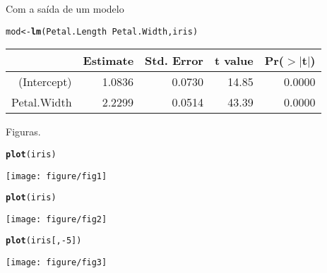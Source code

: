 \documentclass{article}\usepackage[]{graphicx}\usepackage[]{color}
\makeatletter
\def\maxwidth{ %
  \ifdim\Gin@nat@width>\linewidth
    \linewidth
  \else
    \Gin@nat@width
  \fi
}
\newcommand{\hlnum}[1]{\textcolor[rgb]{0.686,0.059,0.569}{#1}}%
\newcommand{\hlopt}[1]{\textcolor[rgb]{0,0,0}{#1}}%
\newcommand{\hlstd}[1]{\textcolor[rgb]{0.345,0.345,0.345}{#1}}%
\newcommand{\hlkwb}[1]{\textcolor[rgb]{0.69,0.353,0.396}{#1}}%
\newcommand{\hlkwd}[1]{\textcolor[rgb]{0.737,0.353,0.396}{\textbf{#1}}}%
\newenvironment{kframe}{%
 \def\at@end@of@kframe{}%
 \ifinner\ifhmode%
  \def\at@end@of@kframe{\end{minipage}}%
  \begin{minipage}{\columnwidth}%
 \fi\fi%
 \def\FrameCommand##1{\hskip\@totalleftmargin \hskip-\fboxsep
 \colorbox{shadecolor}{##1}\hskip-\fboxsep
     \hskip-\linewidth \hskip-\@totalleftmargin \hskip\columnwidth}%
 \MakeFramed {\advance\hsize-\width
   \@totalleftmargin\z@ \linewidth\hsize
   \@setminipage}}%
 {\par\unskip\endMakeFramed%
 \at@end@of@kframe}
\newenvironment{knitrout}{}{} %
\makeatother
\begin{document}
Com a saída de um modelo

\begin{kframe}
\begin{alltt}
\hlstd{mod} \hlkwb{<-} \hlkwd{lm}\hlstd{(Petal.Length} \hlopt{~} \hlstd{Petal.Width, iris)}
\end{alltt}
\end{kframe}%
\begin{table}[ht]
\centering
\begin{tabular}{rrrrr}
  \hline
 & Estimate & Std. Error & t value & Pr($>$$|$t$|$) \\ 
  \hline
(Intercept) & 1.0836 & 0.0730 & 14.85 & 0.0000 \\ 
  Petal.Width & 2.2299 & 0.0514 & 43.39 & 0.0000 \\ 
   \hline
\end{tabular}
\end{table}



\newpage

Figuras.

\begin{knitrout}
\color{fgcolor}\begin{kframe}
\begin{alltt}
\hlkwd{plot}\hlstd{(iris)}
\end{alltt}
\end{kframe}
\texttt{[image: figure/fig1]} 

\end{knitrout}


\newpage

\begin{knitrout}
\color{fgcolor}\begin{kframe}
\begin{alltt}
\hlkwd{plot}\hlstd{(iris)}
\end{alltt}
\end{kframe}
\texttt{[image: figure/fig2]} 

\end{knitrout}


\newpage

\begin{knitrout}
\color{fgcolor}\begin{kframe}
\begin{alltt}
\hlkwd{plot}\hlstd{(iris[,} \hlopt{-}\hlnum{5}\hlstd{])}
\end{alltt}
\end{kframe}

{\centering \texttt{[image: figure/fig3]} 

}



\end{knitrout}
\end{document}
